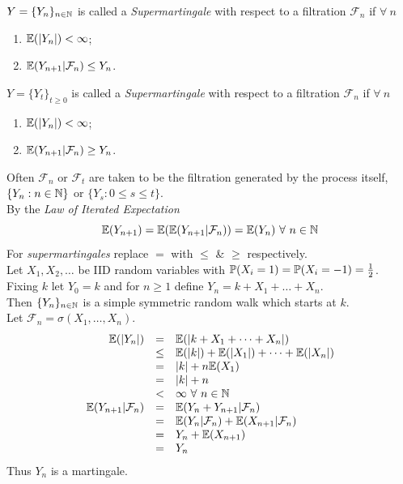 \documentclass[11pt,a4paper]{article}
\begin{document}
$Y=\{Y_n\}_{n\in\mathbb{N}}$ is called a \textit{Supermartingale} with respect to a filtration $\mathcal{F}_n$ if $\forall\ n$
\begin{enumerate}[label=\roman*)]
	\item $\mathbb{E}(|Y_n|)<\infty$;
	\item $\mathbb{E}(Y_{n+1}|\mathcal{F}_n)\leq Y_n$.
\end{enumerate}
$Y=\{Y_t\}_{t\geq0}$ is called a \textit{Supermartingale} with respect to a filtration $\mathcal{F}_n$ if $\forall\ n$
\begin{enumerate}[label=\roman*)]
	\item $\mathbb{E}(|Y_n|)<\infty$;
	\item $\mathbb{E}(Y_{n+1}|\mathcal{F}_n)\geq Y_n$.
\end{enumerate}

Often $\mathcal{F}_n$ or $\mathcal{F}_t$ are taken to be the filtration generated by the process itself, $\{Y_n:n\in\mathbb{N}\}$ or $\{Y_s:0\leq s\leq t\}$.\\

By the \textit{Law of Iterated Expectation}
$$\expect(Y_{n+1})=\expect(\expect(Y_{n+1}|\mathcal{F}_n))=\expect(Y_n)\ \forall\ n\in\nats$$
\nb For \textit{supermartingales} replace $=$ with $\leq$ \& $\geq$ respectively.\\

Let $X_1,X_2,\dots$ be IID random variables with $\mathbb{P}(X_i=1)=\mathbb{P}(X_i=-1)=\frac{1}{2}$.\\
Fixing $k$ let $Y_0=k$ and for $n\geq 1$ define $Y_n=k+X_1+\dots+X_n$.\\
Then $\{Y_n\}_{n\in\mathbb{N}}$ is a simple symmetric random walk which starts at $k$.\\
Let $\mathcal{F}_n=\sigma(X_1,\dots,X_n)$.
\[\begin{array}{rcl}
\mathbb{E}(|Y_n|)&=&\mathbb{E}(|k+X_1+\dots+X_n|)\\
&\leq&\mathbb{E}(|k|)+\mathbb{E}(|X_1|)+\dots+\mathbb{E}(|X_n|)\\
&=&|k|+n\mathbb{E}(X_1)\\
&=&|k|+n\\
&<&\infty\ \forall\ n\in\mathbb{N}\\
\mathbb{E}(Y_{n+1}|\mathcal{F}_n)&=&\mathbb{E}(Y_n+Y_{n+1}|\mathcal{F}_n)\\
&=&\mathbb{E}(Y_n|\mathcal{F}_n)+\mathbb{E}(X_{n+1}|\mathcal{F}_n)\\
&=&Y_n+\mathbb{E}(X_{n+1})\\
&=&Y_n
\end{array}\]
Thus  $Y_n$ is a martingale.\\
\end{document}
